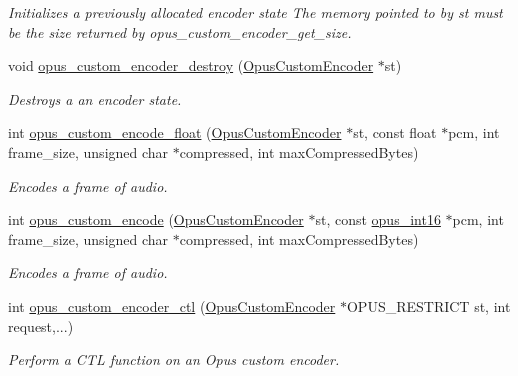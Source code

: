 \begin{DoxyCompactItemize}
\begin{DoxyCompactList}\small\item\em Initializes a previously allocated encoder state The memory pointed to by st must be the size returned by opus\_\-custom\_\-encoder\_\-get\_\-size. \item\end{DoxyCompactList}\item 
void \hyperlink{group__opus__custom_ga5ed5b55bccdc141632d8ba65b8228e7d}{opus\_\-custom\_\-encoder\_\-destroy} (\hyperlink{group__opus__custom_ga7abe6a7afc599667950251c987feb439}{OpusCustomEncoder} $\ast$st)
\begin{DoxyCompactList}\small\item\em Destroys a an encoder state. \item\end{DoxyCompactList}\item 
int \hyperlink{group__opus__custom_ga9403d7a1fc09a0e49692a7f93decee21}{opus\_\-custom\_\-encode\_\-float} (\hyperlink{group__opus__custom_ga7abe6a7afc599667950251c987feb439}{OpusCustomEncoder} $\ast$st, const float $\ast$pcm, int frame\_\-size, unsigned char $\ast$compressed, int maxCompressedBytes)
\begin{DoxyCompactList}\small\item\em Encodes a frame of audio. \item\end{DoxyCompactList}\item 
int \hyperlink{group__opus__custom_ga21d6b0c4106ed5777a8632eed97d4cdc}{opus\_\-custom\_\-encode} (\hyperlink{group__opus__custom_ga7abe6a7afc599667950251c987feb439}{OpusCustomEncoder} $\ast$st, const \hyperlink{opus__types_8h_acc9ed7cf60479eb81f9648c6ec27dc26}{opus\_\-int16} $\ast$pcm, int frame\_\-size, unsigned char $\ast$compressed, int maxCompressedBytes)
\begin{DoxyCompactList}\small\item\em Encodes a frame of audio. \item\end{DoxyCompactList}\item 
int \hyperlink{group__opus__custom_gacf3d854e681cae3b693ee56b54459226}{opus\_\-custom\_\-encoder\_\-ctl} (\hyperlink{group__opus__custom_ga7abe6a7afc599667950251c987feb439}{OpusCustomEncoder} $\ast$OPUS\_\-RESTRICT st, int request,...)
\begin{DoxyCompactList}\small\item\em Perform a CTL function on an Opus custom encoder. \item\end{DoxyCompactList}\item 

\end{DoxyCompactItemize}
